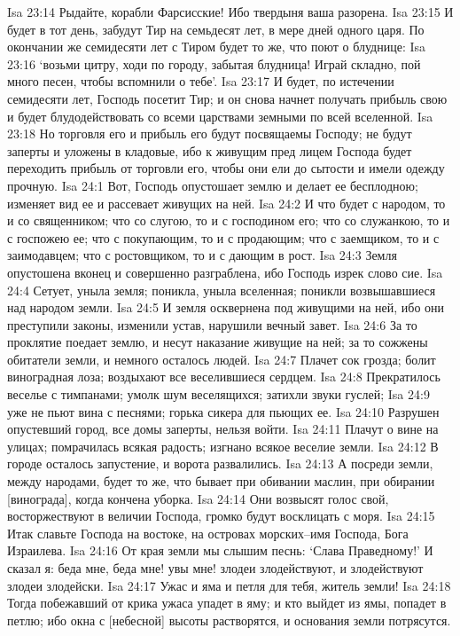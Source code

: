 Isa 23:14  Рыдайте, корабли Фарсисские! Ибо твердыня ваша разорена.
Isa 23:15  И будет в тот день, забудут Тир на семьдесят лет, в мере дней одного царя. По окончании же семидесяти лет с Тиром будет то же, что поют о блуднице:
Isa 23:16  `возьми цитру, ходи по городу, забытая блудница! Играй складно, пой много песен, чтобы вспомнили о тебе'.
Isa 23:17  И будет, по истечении семидесяти лет, Господь посетит Тир; и он снова начнет получать прибыль свою и будет блудодействовать со всеми царствами земными по всей вселенной.
Isa 23:18  Но торговля его и прибыль его будут посвящаемы Господу; не будут заперты и уложены в кладовые, ибо к живущим пред лицем Господа будет переходить прибыль от торговли его, чтобы они ели до сытости и имели одежду прочную.
Isa 24:1  Вот, Господь опустошает землю и делает ее бесплодною; изменяет вид ее и рассевает живущих на ней.
Isa 24:2  И что будет с народом, то и со священником; что со слугою, то и с господином его; что со служанкою, то и с госпожею ее; что с покупающим, то и с продающим; что с заемщиком, то и с заимодавцем; что с ростовщиком, то и с дающим в рост.
Isa 24:3  Земля опустошена вконец и совершенно разграблена, ибо Господь изрек слово сие.
Isa 24:4  Сетует, уныла земля; поникла, уныла вселенная; поникли возвышавшиеся над народом земли.
Isa 24:5  И земля осквернена под живущими на ней, ибо они преступили законы, изменили устав, нарушили вечный завет.
Isa 24:6  За то проклятие поедает землю, и несут наказание живущие на ней; за то сожжены обитатели земли, и немного осталось людей.
Isa 24:7  Плачет сок грозда; болит виноградная лоза; воздыхают все веселившиеся сердцем.
Isa 24:8  Прекратилось веселье с тимпанами; умолк шум веселящихся; затихли звуки гуслей;
Isa 24:9  уже не пьют вина с песнями; горька сикера для пьющих ее.
Isa 24:10  Разрушен опустевший город, все домы заперты, нельзя войти.
Isa 24:11  Плачут о вине на улицах; помрачилась всякая радость; изгнано всякое веселие земли.
Isa 24:12  В городе осталось запустение, и ворота развалились.
Isa 24:13  А посреди земли, между народами, будет то же, что бывает при обивании маслин, при обирании [винограда], когда кончена уборка.
Isa 24:14  Они возвысят голос свой, восторжествуют в величии Господа, громко будут восклицать с моря.
Isa 24:15  Итак славьте Господа на востоке, на островах морских--имя Господа, Бога Израилева.
Isa 24:16  От края земли мы слышим песнь: `Слава Праведному!' И сказал я: беда мне, беда мне! увы мне! злодеи злодействуют, и злодействуют злодеи злодейски.
Isa 24:17  Ужас и яма и петля для тебя, житель земли!
Isa 24:18  Тогда побежавший от крика ужаса упадет в яму; и кто выйдет из ямы, попадет в петлю; ибо окна с [небесной] высоты растворятся, и основания земли потрясутся.
